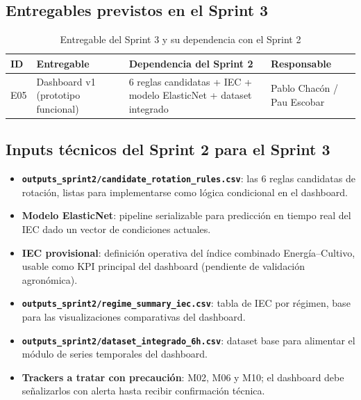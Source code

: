 \documentclass[12pt,a4paper]{article}
\begin{document}
\subsection{Entregables previstos en el Sprint 3}

\begin{table}[H]
\centering
\caption{Entregable del Sprint 3 y su dependencia con el Sprint 2}
\label{tab:entregables_s3}
\renewcommand{\arraystretch}{1.3}
\begin{tabularx}{\textwidth}{llXl}
\toprule
\textbf{ID} & \textbf{Entregable} & \textbf{Dependencia del Sprint 2} & \textbf{Responsable} \\
\midrule
E05
  & Dashboard v1 (prototipo funcional)
  & 6 reglas candidatas + IEC + modelo ElasticNet + dataset integrado
  & Pablo Chacón / Pau Escobar \\
\bottomrule
\end{tabularx}
\end{table}

\subsection{Inputs técnicos del Sprint 2 para el Sprint 3}

\begin{itemize}[noitemsep]
  \item \textbf{\texttt{outputs\_sprint2/candidate\_rotation\_rules.csv}}: las 6 reglas candidatas de rotación, listas para implementarse como lógica condicional en el dashboard.
  \item \textbf{Modelo ElasticNet}: pipeline serializable para predicción en tiempo real del IEC dado un vector de condiciones actuales.
  \item \textbf{IEC provisional}: definición operativa del índice combinado Energía--Cultivo, usable como KPI principal del dashboard (pendiente de validación agronómica).
  \item \textbf{\texttt{outputs\_sprint2/regime\_summary\_iec.csv}}: tabla de IEC por régimen, base para las visualizaciones comparativas del dashboard.
  \item \textbf{\texttt{outputs\_sprint2/dataset\_integrado\_6h.csv}}: dataset base para alimentar el módulo de series temporales del dashboard.
  \item \textbf{Trackers a tratar con precaución}: M02, M06 y M10; el dashboard debe señalizarlos con alerta hasta recibir confirmación técnica.
\end{itemize}
\end{document}
